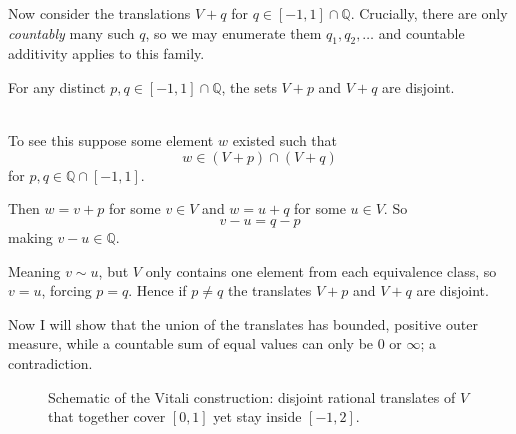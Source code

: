 \documentclass[12pt]{article}
\makeatletter
\theoremstyle{plain}
\theoremstyle{definition}
\theoremstyle{definition}
\theoremstyle{remark}
\renewenvironment{proof}[1][\proofname]{\par
\pushQED{\qed}\normalfont\topsep6\p@\@plus6\p@\relax
\trivlist\item[\hskip\labelsep\small\itshape #1\@addpunct{.}]\ignorespaces\mbox{}\\
}{\popQED\endtrivlist\@endpefalse}
\makeatother
\begin{document}
Now consider the translations $V + q$ for $q \in [-1, 1] \cap \mathbb{Q}$. Crucially, there
are only \emph{countably} many such $q$, so we may enumerate them $q_1, q_2, \ldots$ and
countable additivity applies to this family.

\begin{lemma}
    For any distinct $p, q \in [-1, 1] \cap \mathbb{Q}$, the sets $V + p$ and $V + q$ are disjoint.
\end{lemma}


\begin{proof}[Proof: Translated Classes Disjoint]
To see this suppose some element $w$ existed such that 
\begin{equation*}
    w \in (V + p) \cap (V + q)
\end{equation*}
for $p, q \in \mathbb{Q} \cap [-1, 1]$.

Then $w = v + p$ for some $v \in V$ and
$w = u + q$ for some $u \in V$. So
\begin{equation*}
    v - u = q - p
\end{equation*}
making $v - u \in \mathbb{Q}$.

Meaning $v \sim u$, but $V$ only contains one element from each equivalence class, so $v = u$,
forcing $p = q$. Hence if $p \neq q$ the translates $V + p$ and $V + q$ are disjoint.
\end{proof}

Now I will show that the union of the translates has bounded, positive outer measure, while
a countable sum of equal values can only be $0$ or $\infty$; a contradiction.

\begin{figure}[h]
\centering
{}
\caption{Schematic of the Vitali construction: disjoint rational translates of $V$
that together cover $[0,1]$ yet stay inside $[-1,2]$.}
\end{figure}
\end{document}
